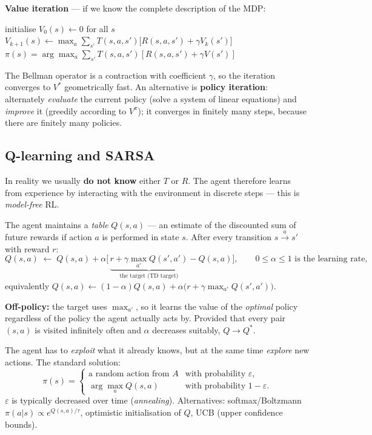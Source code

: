 \documentclass[11pt,a4paper]{article}
\theoremstyle{definition}
\begin{document}
\noindent\textbf{Value iteration} --- if we know the complete description of the MDP:
\begin{algorithmic}[1]
\State initialise $V_0(s) \gets 0$ for all $s$
\Repeat
    \State $V_{k+1}(s) \gets \max_{a} \sum_{s'} T(s,a,s')\big[R(s,a,s') + \gamma V_k(s')\big]$
  \EndFor
{}
\State \Return $\pi(s) = \arg\max_a \sum_{s'} T(s,a,s')[R(s,a,s') + \gamma V(s')]$
\end{algorithmic}
The Bellman operator is a contraction with coefficient $\gamma$, so the iteration converges to $V^*$
geometrically fast. An alternative is \textbf{policy iteration}:
alternately \emph{evaluate} the current policy (solve a system of linear equations) and \emph{improve}
it (greedily according to $V^\pi$); it converges in finitely many steps, because there are finitely
many policies.

\subsection{Q-learning and SARSA}

In reality we usually \textbf{do not know} either $T$ or $R$. The agent therefore learns from
experience by interacting with the environment in discrete steps --- this is \emph{model-free} RL.

\begin{defbox}
The agent maintains a \emph{table} $Q(s,a)$ --- an estimate of the discounted sum of future rewards if
action $a$ is performed in state $s$. After every transition $s \xrightarrow{a} s'$ with reward $r$:
\[
Q(s,a) \;\leftarrow\; Q(s,a) + \alpha\Big[\, \underbrace{r + \gamma \max_{a'} Q(s',a')}
_{\text{the target (TD target)}} - Q(s,a) \Big],
\qquad 0 \le \alpha \le 1 \text{ is the learning rate,}
\]
equivalently $Q(s,a) \leftarrow (1-\alpha)Q(s,a) + \alpha\big(r + \gamma\max_{a'}Q(s',a')\big)$.

\textbf{Off-policy:} the target uses $\max_{a'}$, so it learns the value of the \emph{optimal} policy
regardless of the policy the agent actually acts by. Provided that every pair
$(s,a)$ is visited infinitely often and $\alpha$ decreases suitably, $Q \to Q^*$.
\end{defbox}

\begin{defbox}
The agent has to \emph{exploit} what it already knows, but at the same time \emph{explore}
new actions. The standard solution:
\[
\pi(s) = \begin{cases}
\text{a random action from } A & \text{with probability } \varepsilon,\\
\arg\max_a Q(s,a) & \text{with probability } 1-\varepsilon .
\end{cases}
\]
$\varepsilon$ is typically decreased over time (\emph{annealing}). Alternatives:
softmax/Boltzmann $\pi(a|s) \propto e^{Q(s,a)/\tau}$, optimistic initialisation of $Q$,
UCB (upper confidence bounds).
\end{defbox}
\end{document}
